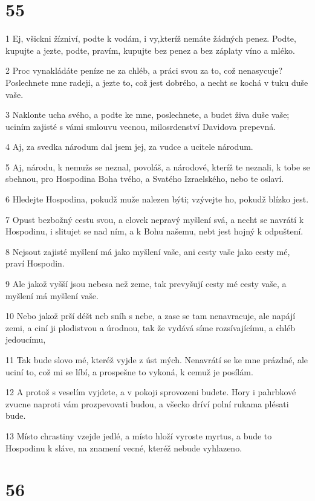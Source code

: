 \chapter{55}

\par 1 Ej, všickni žízniví, podte k vodám, i vy,kteríž nemáte žádných penez. Podte, kupujte a jezte, podte, pravím, kupujte bez penez a bez záplaty víno a mléko.
\par 2 Proc vynakládáte peníze ne za chléb, a práci svou za to, což nenasycuje? Poslechnete mne radeji, a jezte to, což jest dobrého, a necht se kochá v tuku duše vaše.
\par 3 Naklonte ucha svého, a podte ke mne, poslechnete, a budet živa duše vaše; uciním zajisté s vámi smlouvu vecnou, milosrdenství Davidova prepevná.
\par 4 Aj, za svedka národum dal jsem jej, za vudce a ucitele národum.
\par 5 Aj, národu, k nemužs se neznal, povoláš, a národové, kteríž te neznali, k tobe se sbehnou, pro Hospodina Boha tvého, a Svatého Izraelského, nebo te oslaví.
\par 6 Hledejte Hospodina, pokudž muže nalezen býti; vzývejte ho, pokudž blízko jest.
\par 7 Opust bezbožný cestu svou, a clovek nepravý myšlení svá, a necht se navrátí k Hospodinu, i slitujet se nad ním, a k Bohu našemu, nebt jest hojný k odpuštení.
\par 8 Nejsout zajisté myšlení má jako myšlení vaše, ani cesty vaše jako cesty mé, praví Hospodin.
\par 9 Ale jakož vyšší jsou nebesa než zeme, tak prevyšují cesty mé cesty vaše, a myšlení má myšlení vaše.
\par 10 Nebo jakož prší déšt neb sníh s nebe, a zase se tam nenavracuje, ale napájí zemi, a ciní ji plodistvou a úrodnou, tak že vydává síme rozsívajícímu, a chléb jedoucímu,
\par 11 Tak bude slovo mé, kteréž vyjde z úst mých. Nenavrátí se ke mne prázdné, ale uciní to, což mi se líbí, a prospešne to vykoná, k cemuž je posílám.
\par 12 A protož s veselím vyjdete, a v pokoji sprovozeni budete. Hory i pahrbkové zvucne naproti vám prozpevovati budou, a všecko dríví polní rukama plésati bude.
\par 13 Místo chrastiny vzejde jedlé, a místo hloží vyroste myrtus, a bude to Hospodinu k sláve, na znamení vecné, kteréž nebude vyhlazeno.

\chapter{56}

